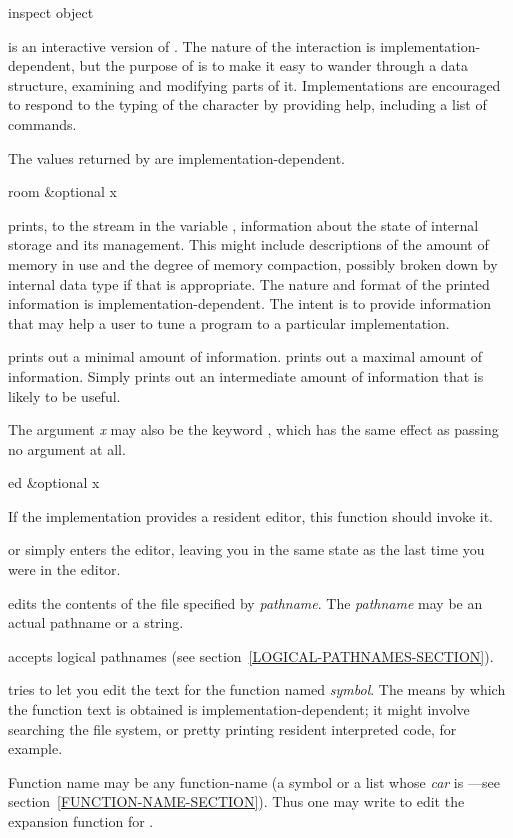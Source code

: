 \begin{defun}[Function]
inspect object

 is an interactive version of .
The nature of the interaction is implementation-dependent,
but the purpose of  is to make it easy to wander
through a data structure, examining and modifying parts of it.
Implementations are encouraged to respond to the typing
of the character  by providing help, including a list
of commands.

The values returned by 
are implementation-dependent.
\end{defun}

\begin{defun}[Function]
room &optional x

 prints, to the stream in the variable ,
information about the state of internal storage and its management.  This
might include descriptions of the amount of memory in use and the degree
of memory compaction, possibly broken down by internal data type if that
is appropriate.  The nature and format of the printed information is
implementation-dependent.  The intent is to provide information that may
help a user to tune a program to a particular implementation.

 prints out a minimal amount of information.
 prints out a maximal amount of information.
Simply  prints out an intermediate amount
of information that is likely to be useful.

The argument \emph{x} may also be the keyword ,
which has the same effect as passing no argument at all.
\end{defun}

\begin{defun}[Function]
ed &optional x

If the implementation provides a resident editor, this function
should invoke it.

 or  simply enters the editor, leaving you in the same
state as the last time you were in the editor.

 edits the contents of the file specified
by \emph{pathname}.  The \emph{pathname} may be an actual pathname
or a string.

 accepts logical pathnames (see
section~\ref{LOGICAL-PATHNAMES-SECTION}).

 tries to let you edit the text for the function
named \emph{symbol}.  The means by which the function text is obtained
is implementation-dependent; it might involve searching the file system,
or pretty printing resident interpreted code, for example.

Function name may be any function-name (a symbol or a list
whose \emph{car} is ---see section~\ref{FUNCTION-NAME-SECTION}).
Thus one may write  to edit the 
expansion function for .
\end{defun}


